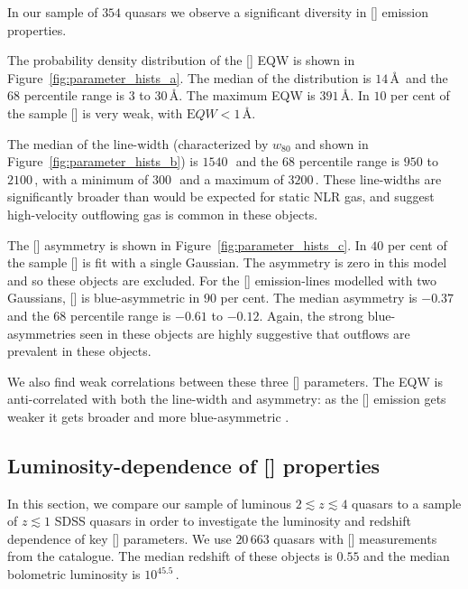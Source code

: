 In our sample of $354$ quasars we observe a significant diversity in [] emission properties. 

The probability density distribution of the [] EQW is shown in Figure~\ref{fig:parameter_hists_a}. 
The median of the distribution is $14$\,\AA\, and the $68$ percentile range is $3$ to $30$\,\AA.
The maximum EQW is $391$\,\AA.  
In $10$ per cent of the sample [] is very weak, with ${\mathrm EQW} < 1$\,\AA.  

The median of the line-width (characterized by $w_{80}$ and shown in Figure~\ref{fig:parameter_hists_b}) is $1540$\,\kms\, and the $68$ percentile range is $950$ to $2100$\,\kms, with a minimum of $300$\,\kms\, and a maximum of $3200$\,\kms.
These line-widths are significantly broader than would be expected for static NLR gas, and suggest high-velocity outflowing gas is common in these objects. 

The [] asymmetry is shown in Figure~\ref{fig:parameter_hists_c}. 
In $40$ per cent of the sample [] is fit with a single Gaussian. 
The asymmetry is zero in this model and so these objects are excluded. 
For the [] emission-lines modelled with two Gaussians, [] is blue-asymmetric in $90$ per cent.
The median asymmetry is $-0.37$ and the $68$ percentile range is $-0.61$ to $-0.12$.
Again, the strong blue-asymmetries seen in these objects are highly suggestive that outflows are prevalent in these objects. 

We also find weak correlations between these three [] parameters. 
The EQW is anti-correlated with both the line-width and asymmetry: as the [] emission gets weaker it gets broader and more blue-asymmetric \citep[e.g.][]{shen14}.  

\subsection{Luminosity-dependence of [] properties}

In this section, we compare our sample of luminous $2 \lesssim z \lesssim 4$ quasars to a sample of $z\lesssim1$ SDSS quasars in order to investigate the luminosity and redshift dependence of key [] parameters. 
We use $20\,663$ quasars with [] measurements from the \citet{shen11} catalogue. 
The median redshift of these objects is $0.55$ and the median bolometric luminosity is $10^{45.5}$\,\ergs.

